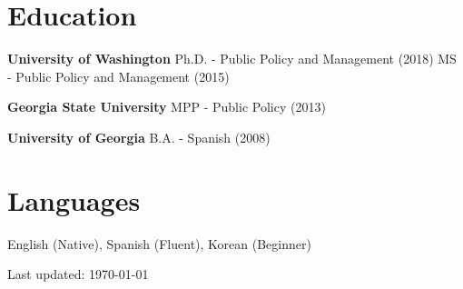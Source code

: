 \documentclass{article}
\renewenvironment{itemize}{
  \begin{list}{}{
    \setlength{\leftmargin}{0em}
  }
}{
  \end{list}
}
\begin{document}
{\vspace{0.5mm}

\section*{Education}
\vspace{-4mm}
\hrulefill
\begin{itemize}
  \item \textbf{University of Washington}
	\subitem Ph.D. - Public Policy and Management (2018)
	\subitem MS - Public Policy and Management (2015)
	
\item \textbf{Georgia State University}
	\subitem MPP - Public Policy (2013)

\item \textbf{University of Georgia}
	\subitem B.A. - Spanish (2008)
\end{itemize}


\vspace{0.5mm}

\section*{Languages}
\vspace{-4mm}
\hrulefill
\begin{itemize}
	\item English (Native), Spanish (Fluent), Korean (Beginner)
\end{itemize}

\vspace{0.5mm}


\vfill

\begin{center}
  \begin{footnotesize}
    Last updated: \today \\
  \end{footnotesize}
\end{center}
\end{document}
